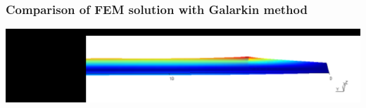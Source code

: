 \documentclass[9pt]{beamer}
\begin{document}
\begin{frame}
\begin{figure}[h!]










\end{figure}
\end{frame}



\begin{frame}
\frametitle{Comparison of FEM solution with Galarkin method }

\begin{figure}


\end{figure}



\href{run:images/galcomp.mpg}{\includegraphics[width=1.0\textwidth,trim={10.5cm 0cm 0cm 2cm},clip]{images/galcomp.png}}
\end{frame}
\end{document}
